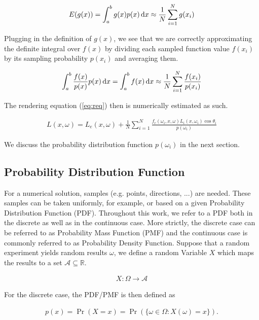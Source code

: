 \begin{align}
E(g(x)) = \int_a^b g(x)p(x)\mathop{}\!\mathrm{d} x \approx \frac{1}{N} \sum_{i=1}^{N} g(x_i) 
\end{align}

Plugging in the definition of $g(x)$, we see that we are correctly approximating the definite integral over $f(x)$ by dividing each sampled function value $f(x_i)$ by its sampling probability $p(x_i)$ and averaging them.

\begin{align}
\label{eq:mci}
\int_a^b \frac{f(x)}{p(x)}p(x)\mathop{}\!\mathrm{d} x = \int_a^b f(x) \mathop{}\!\mathrm{d} x \approx \frac{1}{N} \sum_{i=1}^{N} \frac{f(x_i)}{p(x_i)}
\end{align}


The rendering equation (\ref{eq:req}) then is numerically estimated as such.

\begin{align}
\label{eq:reqmc}
L(x, \omega) =  L_e(x, \omega) + \frac{1}{N} \sum_{i=1}^{N} \frac{f_r(\omega_i, x, \omega) L_i(x, \omega_i)\cos\theta_i}{p(\omega_i)}
\end{align}

We discuss the probability distribution function $p(\omega_i)$ in the next section.

\subsection{Probability Distribution Function}
\label{sec:PDF}

For a numerical solution, samples (e.g. points, directions, ...) are needed. These samples can be taken uniformly, for example, or based on a given Probability Distribution Function (PDF). Throughout this work, we refer to a PDF both in the discrete as well as in the continuous case. More strictly, the discrete case can be referred to as Probability Mass Function (PMF) and the continuous case is commonly referred to as Probability Density Function. Suppose that a random experiment yields random results $\omega$, we define a random Variable $X$ which maps the results to a set $\mathcal{A} \subseteq \mathbb{R}$.

\begin{align}
X: \Omega \rightarrow \mathcal{A}
\end{align}

For the discrete case, the PDF/PMF is then defined as

\begin{align}
p(x) = \Pr(X = x) = \Pr( \{\omega \in \Omega : X(\omega) = x \} ).
\end{align}

